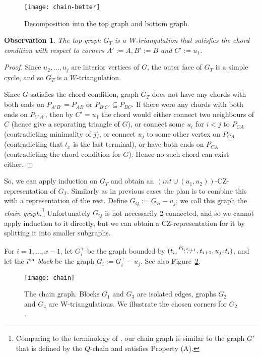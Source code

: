 \documentclass{article}
\renewcommand{\int}[1]{$(\mathit{int}\cup{#1})$}
\newtheorem{observation}[theorem]{Observation}
\begin{document}
\begin{figure}
	\centering
	\texttt{[image: chain-better]}
	\caption{Decomposition into the top graph and bottom graph.}
        \label{fig:top-bottom}
\end{figure}

\begin{observation}
        The top graph $G_T$ is a W-triangulation that satisfies the chord condition with respect to corners
	$A':= A, B':= B$ and $C':=u_1$. 
\end{observation}
\begin{proof}
Since $u_2,\dots,u_j$ are interior vertices of $G$, the outer face of $G_T$
is a simple cycle, and so $G_T$ is a $W$-triangulation.

    Since $G$ satisfies the chord condition, graph $G_T$ does not have any 
chords with both ends on $P_{A'B'} = P_{AB}$ or $P_{B'C'} \subseteq P_{BC}$.
If there were any chords with both ends on $P_{C'A'}$, then by $C'=u_1$
the chord would either
connect two neighbours of $C$ (hence give a separating triangle of $G$),
or connect some $u_i$ for $i<j$ to $P_{CA}$ (contradicting minimality of $j$),
or connect $u_j$ to some other vertex on $P_{CA}$ (contradicting that
$t_x$ is the last terminal), or have both ends on $P_{CA}$ (contradicting the chord condition
for $G$).    Hence no such chord can exist either.
\end{proof}

So, we can apply induction on $G_T$ and obtain an
\int{(u_1,u_2)}-CZ-rep\-re\-sen\-ta\-tion of $G_T$.  Similarly as in previous cases
the plan is to combine this with a representation of the rest.
Define $G_Q:= G_B-u_j$; we call this graph the {\em chain graph}.\footnote{Comparing to the terminology of \cite{cit:ham-cycle}, our chain
graph is similar to the graph $G'$ that is defined by the $Q$-chain and
satisfies Property (A).}
Unfortunately $G_Q$ is not
necessarily 2-connected, and so we cannot apply induction to it directly,
but we can obtain a CZ-representation for it by splitting it into smaller subgraphs.

For $i=1,\dots,x-1$, let $G_i^+$ be the graph bounded by $(t_i,
\stackrel{{\normalsize P_{t_it_{i+1}}}}{\ldots}, t_{i+1},u_j,t_i)$, 
and let the {\em $i^{\mbox{\scriptsize{th}}}$ block}
be the graph $G_i := G_i^+-u_j$.  See also Figure~\ref{fig:chain_blocks}.

\begin{figure}
	\centering
	\texttt{[image: chain]}
	\caption{The chain graph. Blocks $G_1$ and $G_3$ are isolated
	edges, graphs $G_2$ and $G_4$ are W-triangulations.  We illustrate
	the chosen corners for $G_2$.}
	\label{fig:chain_blocks}
\end{figure}
\end{document}

